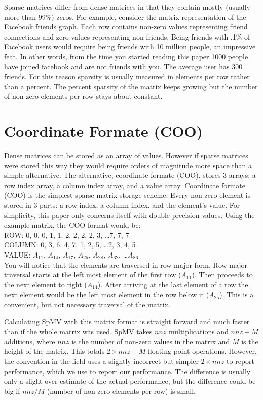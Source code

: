 \par Sparse matrices differ from dense matrices in that they contain mostly (usually more than 99\%) zeros. For example, consider the matrix representation of the Facebook friends graph. Each row contains non-zero values representing friend connections and zero values representing non-friends. Being friends with .1\% of Facebook users would require being friends with 10 million people, an impressive feat. In other words, from the time you started reading this paper 1000 people have joined facebook and are not friends with you. The average user has 300 friends. For this reason sparsity is usually measured in elements per row rather than a percent. The percent sparsity of the matrix keeps growing but the number of non-zero elements per row stays about constant.
\section{Coordinate Formate (COO)}
\par Dense matrices can be stored as an array of values. However if sparse matrices were stored this way they would require orders of magnitude more space than a simple alternative. The alternative, coordinate formate (COO), stores 3 arrays: a row index array, a column index array, and a value array.
Coordinate formate (COO) is the simplest sparse matrix storage scheme. Every non-zero element is stored in 3 parts: a row index, a column index, and the element's value. For simplicity, this paper only concerns itself with double precision values. Using the example matrix, the COO format would be:\\
ROW: 0, 0, 0, 1, 1, 2, 2, 2, 2, 3, \dots 7, 7, 7 \\ \normalsize
COLUMN: 0, 3, 6, 4, 7, 1, 2, 5, \dots 2, 3, 4, 5\\ \normalsize
VALUE: $A_{11}$, $A_{14}$, $A_{17}$, $A_{25}$, $A_{28}$, $A_{32}$, \dots $A_{86}$\\ \normalsize
\indent You will notice that the elements are traversed in row-major form. Row-major traversal starts at the left most element of the first row ($A_{11}$). Then proceeds to the next element to right ($A_{14}$). After arriving at the last element of a row the next element would be the left most element in the row below it ($A_{25}$). This is a convenient, but not necessary traversal of the matrix. 
\par Calculating SpMV with this matrix format is straight forward and much faster than if the whole matrix was used. SpMV takes $nnz$ multiplications and $nnz-M$ additions, where $nnz$ is the number of non-zero values in the matrix and $M$ is the height of the matrix. This totals $2\times nnz - M$ floating point operations. However, the convention in the field uses a slightly incorrect but simpler $2\times nnz$ to report performance, which we use to report our performance. The difference is usually only a slight over estimate of the actual performance, but the difference could be big if $nnz/M$ (number of non-zero elements per row) is small.
